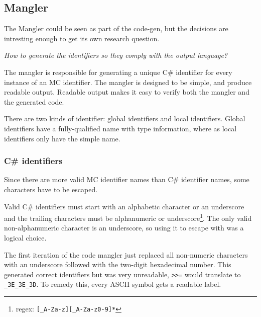 \subsection{Mangler}
The Mangler could be seen as part of the code-gen, but the decisions are intresting enough to get its own research question.

\textit{How to generate the identifiers so they comply with the output language?}

The mangler is responsible for generating a unique C\# identifier for every instance of an MC identifier.
The mangler is designed to be simple, and produce readable output.
Readable output makes it easy to verify both the mangler and the generated code.

There are two kinds of identifier: global identifiers and local identifiers.
Global identifiers have a fully-qualified name with type information, where as local identifiers only have the simple name.

\subsubsection{C\# identifiers}
Since there are more valid MC identifier names than C\# identifier names, some characters have to be escaped.

Valid C\# identifiers must start with an alphabetic character or an underscore and the trailing characters must be alphanumeric or underscore\footnote{regex: \texttt{[\_A-Za-z][\_A-Za-z0-9]*}}\cite{msdn_identifiers}.
The only valid non-alphanumeric character is an underscore, so using it to escape with was a logical choice.

The first iteration of the code mangler just replaced all non-numeric characters with an underscore followed with the two-digit hexadecimal number.
This generated correct identifiers but was very unreadable, \verb|>>=| would translate to \verb|_3E_3E_3D|.
To remedy this, every ASCII symbol gets a readable label.


